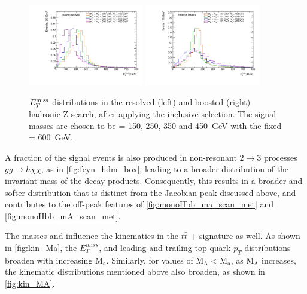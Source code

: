 \begin{figure}
\centering

\includegraphics[width=0.45\textwidth]{texinputs/04_grid/figures/monoz/hadronic/mA600_incl_resl_MET_linear.pdf}
\includegraphics[width=0.45\textwidth]{texinputs/04_grid/figures/monoz/hadronic/mA600_incl_merged_MET_linear.pdf}
\caption{$E_T^\mathrm{miss}$ distributions in the resolved (left) and boosted (right) hadronic Z search, after applying the inclusive selection. 
The signal masses are chosen to be \ma = 150, 250, 350 and 450~GeV with the fixed \mA = 600~GeV.
\label{fig:monozhad_kin_inc_fixed_mA}}

\end{figure}

A fraction of the signal events is also produced in non-resonant $2 \to 3$ processes $gg \to h \chi \chi$, as in \autoref{fig:feyn_hdm_box}, leading to a broader distribution of the invariant mass of the decay products. 
Consequently, this results in a broader and softer \met distribution that is distinct from the Jacobian peak discussed above, and contributes to the off-peak features of \autoref{fig:monoHbb_ma_scan_met} and \autoref{fig:monoHbb_mA_scan_met}. 

The masses \ma and \mA influence the kinematics in the $t\bar{t}$ + \MET signature as well. As shown in \autoref{fig:kin_Ma}, the $E_{T}^{miss}$, and leading and trailing top quark $p_{T}$ distributions broaden with increasing $\mathrm{M_{a}}$. 
Similarly, for values of $\mathrm{M_{A}} < \mathrm{M_{a}}$, as $\mathrm{M_{A}}$ increases, the kinematic distributions mentioned above also broaden, as shown in \autoref{fig:kin_MA}.

